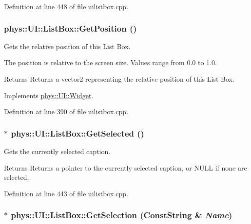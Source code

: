 Definition at line 448 of file uilistbox.cpp.

\hypertarget{classphys_1_1UI_1_1ListBox_af688db0628a5588865a890584f754b02}{
\subsubsection[{GetPosition}]{ phys::UI::ListBox::GetPosition ()}}
\label{d0/d28/classphys_1_1UI_1_1ListBox_af688db0628a5588865a890584f754b02}


Gets the relative position of this List Box. 

The position is relative to the screen size. Values range from 0.0 to 1.0. \begin{DoxyReturn}{Returns}
Returns a vector2 representing the relative position of this List Box. 
\end{DoxyReturn}


Implements \hyperlink{classphys_1_1UI_1_1Widget_a3e464b028b0d1b5755923b8790260c33}{phys::UI::Widget}.



Definition at line 390 of file uilistbox.cpp.

\hypertarget{classphys_1_1UI_1_1ListBox_a729f4ef3e0bc10bf8e96f20a83767484}{
\subsubsection[{GetSelected}]{ $\ast$ phys::UI::ListBox::GetSelected ()}}
\label{d0/d28/classphys_1_1UI_1_1ListBox_a729f4ef3e0bc10bf8e96f20a83767484}


Gets the currently selected caption. 

\begin{DoxyReturn}{Returns}
Returns a pointer to the currently selected caption, or NULL if none are selected. 
\end{DoxyReturn}


Definition at line 443 of file uilistbox.cpp.

\hypertarget{classphys_1_1UI_1_1ListBox_a1a5f9c44430387cc96744411bea9e978}{
\subsubsection[{GetSelection}]{ $\ast$ phys::UI::ListBox::GetSelection ({\bf ConstString} \& {\em Name})}}
\label{d0/d28/classphys_1_1UI_1_1ListBox_a1a5f9c44430387cc96744411bea9e978}


